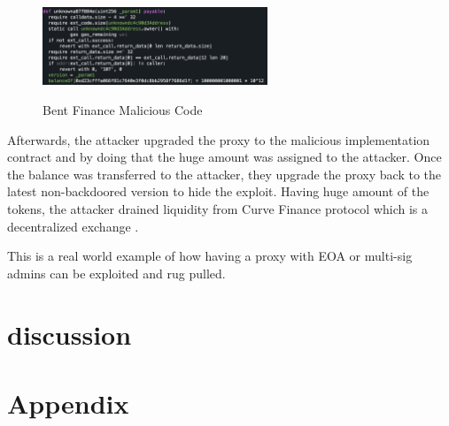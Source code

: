 \begin{figure}[t]
  \centering
  \includegraphics[width=0.6\textwidth]{figures/bent.png}\label{bentFi}
  \caption{Bent Finance Malicious Code}
\end{figure}

Afterwards, the attacker upgraded the proxy to the malicious implementation contract and by doing that the huge amount was assigned to the attacker. Once the balance was transferred to the attacker, they upgrade the proxy back to the latest non-backdoored version to hide the exploit. 
Having huge amount of the tokens, the attacker drained liquidity from Curve Finance protocol which is a decentralized exchange \cite{bentFinanceHack}.

This is a real world example of how having a proxy with EOA or multi-sig admins can be exploited and rug pulled.




\section{discussion}



\section{Appendix}

